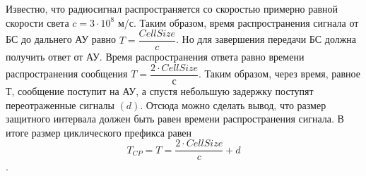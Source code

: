 Известно, что радиосигнал распространяется со скоростью примерно равной скорости света \(c = 3 \cdot
10^{8}\) м/с. Таким образом, время распространения сигнала от БС до дальнего АУ равно
\(T = \dfrac{Cell Size}{c}\). Но для завершения передачи БС должна получить ответ от АУ.
Время распространения ответа равно времени распространения сообщения \(T = \dfrac{2 \cdot Cell Size}{с}\). Таким образом, через время, равное \(Т\), сообщение поступит на АУ, а спустя небольшую
задержку поступят переотраженные сигналы \((d)\).
Отсюда можно сделать вывод, что размер защитного интервала должен быть равен времени распространения
сигнала. В итоге размер циклического префикса равен \[T_{CP} = T = \dfrac{2 \cdot Cell Size}{c} + d\].

\newpage
